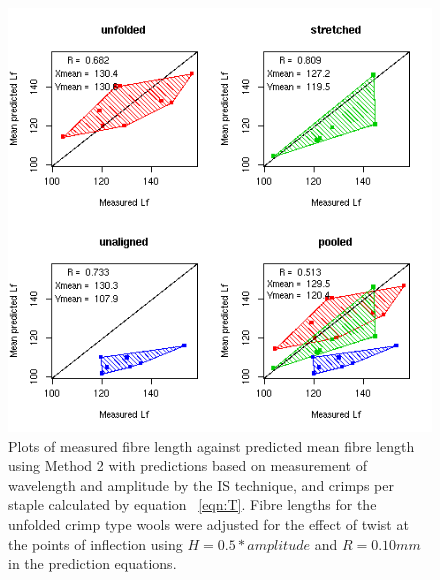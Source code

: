 %

\begin{figure}[!h]
  \centering
  \includegraphics[width=1.1\textwidth]{figispredlf.png}
  \caption{Plots of measured fibre length against predicted mean fibre length using Method 2 with predictions based on measurement of wavelength and amplitude by the IS technique, and crimps per staple calculated by equation ~\ref{eqn:T}. Fibre lengths for the unfolded crimp type wools were adjusted for the effect of twist at the points of inflection using $H = 0.5 * amplitude$ and $R = 0.10 mm$ in the prediction equations.}
  \label{fig:ispredlf}
\end{figure}

%

